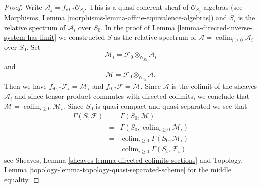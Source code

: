 \documentclass[10pt,a4paper]{amsart}
\theoremstyle{plain}
\theoremstyle{definition}
\theoremstyle{remark}
\numberwithin{equation}{subsection}
\def\colim{\mathop{\mathrm{colim}}\nolimits}
\begin{document}
\begin{proof}
Write $\mathcal{A}_j = f_{i0, *} \mathcal{O}_{S_i}$.
This is a quasi-coherent sheaf of $\mathcal{O}_{S_0}$-algebras
(see Morphisms, Lemma \ref{morphisms-lemma-affine-equivalence-algebras})
and $S_i$ is the relative spectrum of $\mathcal{A}_i$ over $S_0$.
In the proof of Lemma \ref{lemma-directed-inverse-system-has-limit}
we constructed $S$ as the relative spectrum of
$\mathcal{A} = \colim_{i \geq 0} \mathcal{A}_i$
over $S_0$. Set
$$
\mathcal{M}_i = \mathcal{F}_0 \otimes_{\mathcal{O}_{S_0}} \mathcal{A}_i
$$
and
$$
\mathcal{M} = \mathcal{F}_0 \otimes_{\mathcal{O}_{S_0}} \mathcal{A}.
$$
Then we have $f_{i0, *} \mathcal{F}_i = \mathcal{M}_i$
and $f_{0, *}\mathcal{F} = \mathcal{M}$. Since $\mathcal{A}$
is the colimit of the sheaves $\mathcal{A}_i$ and since tensor
product commutes with directed colimits, we conclude that
$\mathcal{M} = \colim_{i \geq 0} \mathcal{M}_i$.
Since $S_0$ is quasi-compact and quasi-separated we see that
\begin{eqnarray*}
\Gamma(S, \mathcal{F})
& = &
\Gamma(S_0, \mathcal{M}) \\
& = &
\Gamma(S_0, \colim_{i \geq 0} \mathcal{M}_i) \\
& = &
\colim_{i \geq 0} \Gamma(S_0, \mathcal{M}_i) \\
& = &
\colim_{i \geq 0} \Gamma(S_i, \mathcal{F}_i)
\end{eqnarray*}
see Sheaves, Lemma \ref{sheaves-lemma-directed-colimits-sections} and
Topology, Lemma \ref{topology-lemma-topology-quasi-separated-scheme}
for the middle equality.
\end{proof}
\end{document}
